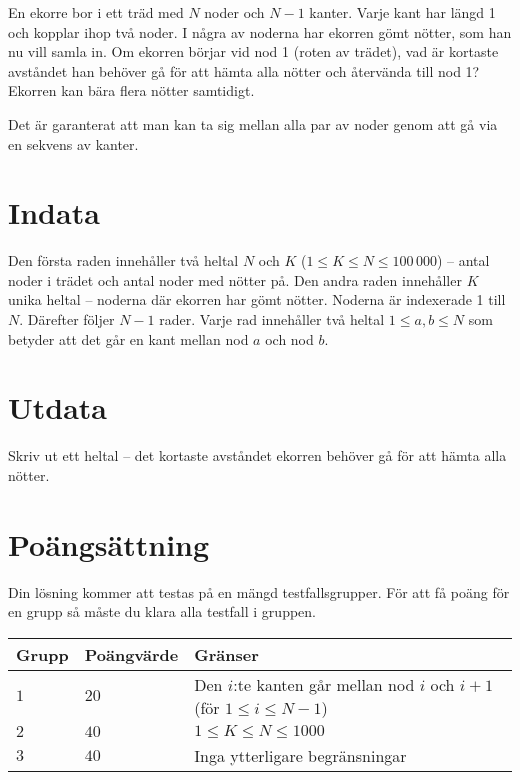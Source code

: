
En ekorre bor i ett träd med $N$ noder och $N-1$ kanter.
Varje kant har längd 1 och kopplar ihop två noder.
I några av noderna har ekorren gömt nötter, som han nu vill samla in.
Om ekorren börjar vid nod 1 (roten av trädet),
vad är kortaste avståndet han behöver gå för att hämta alla nötter och återvända till nod 1? Ekorren kan bära flera nötter samtidigt.

Det är garanterat att man kan ta sig mellan alla par av noder genom att gå via en sekvens av kanter.


\section*{Indata}
Den första raden innehåller två heltal $N$ och $K$ ($1 \le K\le N \le 100\,000$) -- antal noder i trädet och antal noder med nötter på.
Den andra raden innehåller $K$ unika heltal -- noderna där ekorren har gömt nötter. Noderna är indexerade 1 till $N$.
Därefter följer $N-1$ rader. Varje rad innehåller två heltal $1 \le a,b \le N$ som betyder att det går en kant mellan nod $a$ och nod $b$.

\section*{Utdata}
Skriv ut ett heltal -- det kortaste avståndet ekorren behöver gå för att hämta alla nötter.

\section*{Poängsättning}
Din lösning kommer att testas på en mängd testfallsgrupper.
För att få poäng för en grupp så måste du klara alla testfall i gruppen.

\noindent
\begin{tabular}{| l | l | l |}
  \hline
  Grupp & Poängvärde & Gränser \\ \hline
  $1$    & $20$        &  Den $i$:te kanten går mellan nod $i$ och $i+1$ (för $1\le i \le N-1$) \\ \hline 
  $2$    & $40$        &  $1 \le K \le N \le 1000$ \\ \hline
  $3$    & $40$        &  Inga ytterligare begränsningar \\ \hline
\end{tabular}
